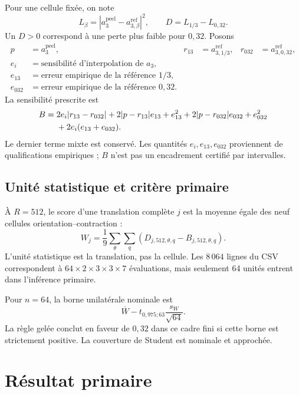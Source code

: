 \documentclass[11pt,a4paper]{article}
\begin{document}
Pour une cellule fixée, on note
\begin{equation}
  L_\beta=\left|a_3^{\mathrm{peel}}-a_{3,\beta}^{\mathrm{ref}}\right|^2,
  \qquad D=L_{1/3}-L_{0{,}32}.
\end{equation}
Un $D>0$ correspond à une perte plus faible pour $0{,}32$. Posons
\begin{align*}
  p&=a_3^{\mathrm{peel}}, & r_{13}&=a_{3,1/3}^{\mathrm{ref}},
  & r_{032}&=a_{3,0{,}32}^{\mathrm{ref}},\\
  e_i&=\text{sensibilité d'interpolation de }a_3,\\
  e_{13}&=\text{erreur empirique de la référence }1/3,\\
  e_{032}&=\text{erreur empirique de la référence }0{,}32.
\end{align*}
La sensibilité prescrite est
\begin{align}
 B={}&2e_i|r_{13}-r_{032}|
 +2|p-r_{13}|e_{13}+e_{13}^{2}
 +2|p-r_{032}|e_{032}+e_{032}^{2}\notag\\
 &+2e_i(e_{13}+e_{032}).
 \label{eq:B}
\end{align}
Le dernier terme mixte est conservé. Les quantités $e_i,e_{13},e_{032}$ proviennent de qualifications empiriques ; $B$ n'est pas un encadrement certifié par intervalles.

\subsection{Unité statistique et critère primaire}

À $R=512$, le score d'une translation complète $j$ est la moyenne égale des neuf cellules orientation--contraction :
\begin{equation}
  W_j=\frac{1}{9}\sum_{\theta}\sum_q(D_{j,512,\theta,q}-B_{j,512,\theta,q}).
\end{equation}
L'unité statistique est la translation, pas la cellule. Les $8\,064$ lignes du CSV correspondent à
$64\times2\times3\times3\times7$ évaluations, mais seulement 64 unités entrent dans l'inférence primaire.

Pour $n=64$, la borne unilatérale nominale est
\begin{equation}
  \overline W-t_{0{,}975;63}\frac{s_W}{\sqrt{64}}.
\end{equation}
La règle gelée conclut en faveur de $0{,}32$ dans ce cadre fini si cette borne est strictement positive. La couverture de Student est nominale et approchée.

\section{Résultat primaire}
\end{document}
